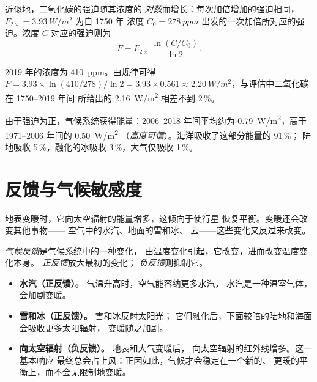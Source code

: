 \begin{proposition}\label{prop:g12:climate-change:log}
近似地，二氧化碳的强迫随其浓度的
\emph{对数}而增长：每次加倍增加的强迫相同，
$F_{2\times} = \qty{3.93}{W/m^2}$ 为自 1750 年
浓度 $C_0 = \qty{278}{ppm}$ 出发的一次加倍所对应的强迫。浓度 $C$ 对应的强迫则为
\[
  F = F_{2\times}\,\frac{\ln (C/C_0)}{\ln 2}.
\]
\end{proposition}

\begin{example}[依据评估结果检验该规律]\label{ex:g12:climate-change:check}
2019 年的浓度为 \qty{410}{ppm}。由规律可得
$F = 3.93 \times \ln(410/278)/\ln 2 = 3.93 \times 0.561 \approx
\qty{2.20}{W/m^2}$，与评估中二氧化碳在 1750--2019 年间
所给出的 \qty{2.16}{W/m^2} 相差不到 2\,\%。
\end{example}

\begin{proposition}[多余的能量去向何方]\label{prop:g12:climate-change:heating}
由于强迫为正，气候系统获得能量：2006--2018 年间平均约为
\qty{0.79}{W/m^2}，高于 1971--2006 年间的 \qty{0.50}{W/m^2}
（\emph{高度可信}）。海洋吸收了这部分能量的 91\,\%；
陆地吸收 5\,\%，融化的冰吸收 3\,\%，大气仅吸收 1\,\%。
\end{proposition}

\section{反馈与气候敏感度}

地表变暖时，它向太空辐射的能量增多，这倾向于使行星
恢复平衡。变暖还会改变其他事物——
空气中的水汽、地面的雪和冰、
云——这些变化又反过来改变。

\begin{definition}[气候反馈]\label{def:g12:climate-change:feedback}
\emph{气候反馈}是气候系统中的一种变化，
由温度变化引起，它改变，进而改变温度变化本身。
\emph{正反馈}放大最初的变化；
\emph{负反馈}则抑制它。
\end{definition}

\begin{example}[三种反馈]\label{ex:g12:climate-change:three}
\begin{itemize}
  \item \textbf{水汽（正反馈）。} 气温升高时，空气能容纳更多水汽，
        水汽是一种温室气体，会加剧变暖。
  \item \textbf{雪和冰（正反馈）。} 雪和冰反射太阳光；
        它们融化后，下面较暗的陆地和海面会吸收更多太阳辐射，
        变暖随之加剧。
  \item \textbf{向太空辐射（负反馈）。} 地表和大气变暖后，
        向太空辐射的红外线增多。这一基本响应
        最终总会占上风：正因如此，气候才会稳定在一个新的、
        更暖的平衡上，而不会无限制地变暖。
\end{itemize}
\end{example}

